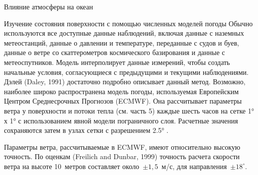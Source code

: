 \begin{chapter}{Влияние атмосферы на океан}
\begin{section}{Изучение состояния поверхности с помощью численных моделей погоды}
Обычно используются все доступные данные наблюдений, включая данные с
наземных метеостанций, данные о давлении и температуре, переданные с
судов и буев, данные о ветре со скаттерометров космического
базирования и данные с метеоспутников. Модель интерполирует данные
измерений, чтобы создать начальные условия, согласующиеся с
предыдущими и текущими наблюдениями. Дэлей (Daley, 1991) достаточно
подробно описывает данный метод.
%
%
Возможно, наиболее широко распространена модель погоды, используемая
Европейским Центром Среднесрочных Прогнозов (ECMWF). Она рассчитывает
параметры ветра у поверхности и потоки тепла (см. часть 5) каждые
шесть часов на сетке 1° х 1° с использованием явной модели
пограничного слоя. Расчетные значения сохраняются затем в узлах сетки
с разрешением 2.5° .
%

Параметры ветра, рассчитываемые в ECMWF, имеют относительно высокую
точность. По оценкам (Freilich and Dunbar, 1999) точность расчета
скорости ветра на высоте 10~метров составляет около~$\pm 1,5$~м/с, для
направления~$\pm 18^\circ$.
%


\end{section}
\end{chapter}
